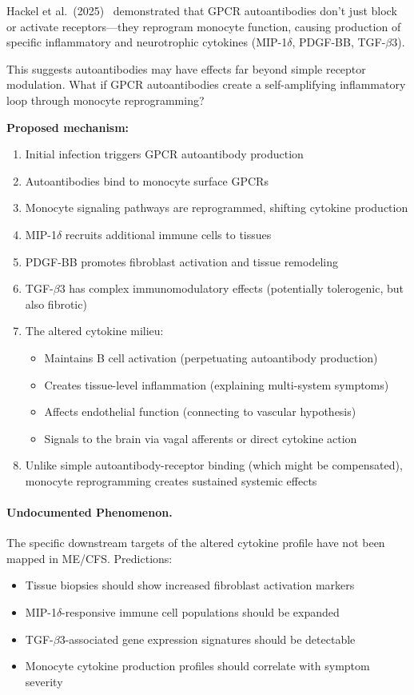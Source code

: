 \begin{open_question}
Hackel et al.\ (2025)~\cite{Hackel2025monocyte} demonstrated that GPCR autoantibodies don't just block or activate receptors---they reprogram monocyte function, causing production of specific inflammatory and neurotrophic cytokines (MIP-1$\delta$, PDGF-BB, TGF-$\beta$3).

This suggests autoantibodies may have effects far beyond simple receptor modulation. What if GPCR autoantibodies create a self-amplifying inflammatory loop through monocyte reprogramming?

\textbf{Proposed mechanism:}
\begin{enumerate}
    \item Initial infection triggers GPCR autoantibody production
    \item Autoantibodies bind to monocyte surface GPCRs
    \item Monocyte signaling pathways are reprogrammed, shifting cytokine production
    \item MIP-1$\delta$ recruits additional immune cells to tissues
    \item PDGF-BB promotes fibroblast activation and tissue remodeling
    \item TGF-$\beta$3 has complex immunomodulatory effects (potentially tolerogenic, but also fibrotic)
    \item The altered cytokine milieu:
    \begin{itemize}
        \item Maintains B cell activation (perpetuating autoantibody production)
        \item Creates tissue-level inflammation (explaining multi-system symptoms)
        \item Affects endothelial function (connecting to vascular hypothesis)
        \item Signals to the brain via vagal afferents or direct cytokine action
    \end{itemize}
    \item Unlike simple autoantibody-receptor binding (which might be compensated), monocyte reprogramming creates sustained systemic effects
\end{enumerate}
\end{open_question}

\paragraph{Undocumented Phenomenon.} The specific downstream targets of the altered cytokine profile have not been mapped in ME/CFS. Predictions:
\begin{itemize}
    \item Tissue biopsies should show increased fibroblast activation markers
    \item MIP-1$\delta$-responsive immune cell populations should be expanded
    \item TGF-$\beta$3-associated gene expression signatures should be detectable
    \item Monocyte cytokine production profiles should correlate with symptom severity
\end{itemize}

